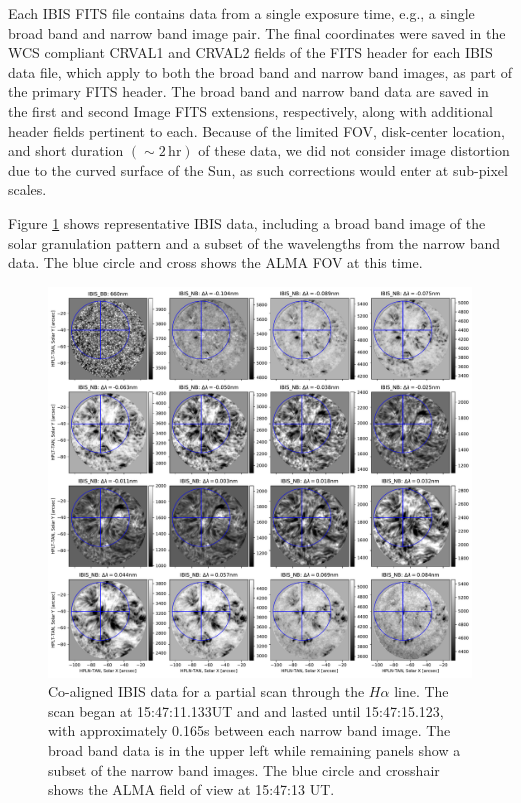 \documentclass[twocolumn]{aastex62}
\newcommand{\unit}[1]{\ensuremath{\, \mathrm{#1}}}
\newcommand{\figref}[1]{Figure \ref{#1}}
\newcommand{\halpha}{\ensuremath{H\alpha}}
\begin{document}
Each IBIS FITS file contains data from a single exposure time, e.g., a single broad band and narrow band image pair.
The final coordinates were saved in the WCS compliant CRVAL1 and CRVAL2 fields of the FITS header for each IBIS data file, which apply to both the broad band and narrow band images, as part of the primary FITS header.
The broad band and narrow band data are saved in the first and second Image FITS extensions, respectively, along with additional header fields pertinent to each.
Because of the limited FOV, disk-center location, and short duration $(\sim 2\unit{hr})$ of these data, we did not consider image distortion due to the curved surface of the Sun, as such corrections would enter at sub-pixel scales.\par

\figref{fig:IBISgrid} shows representative IBIS data, including a broad band image of the solar granulation pattern and a subset of the wavelengths from the narrow band data.  The blue circle and cross shows the ALMA FOV at this time.

\begin{figure}
    \centering
    \includegraphics[width=7in]{./figures/IBIS_ALMAcirc_grid}
    \caption{Co-aligned IBIS data for a partial scan through the \halpha{} line.  The scan began at 15:47:11.133UT and and lasted until 15:47:15.123, with approximately 0.165s between each narrow band image. The broad band data is in the upper left while remaining panels show a subset of the narrow band images.  The blue circle and crosshair shows the ALMA field of view at 15:47:13 UT.}
    \label{fig:IBISgrid}
\end{figure}
\end{document}

